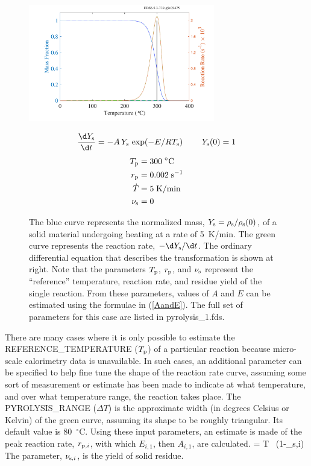 \documentclass[11pt]{book}
\begin{document}
\begin{figure}[ht]
\noindent
\begin{minipage}{0.5\textwidth}
\includegraphics[width=3.2in]{SCRIPT_FIGURES/pyrolysis_1}
\end{minipage}
\hfill
\begin{minipage}{0.5\textwidth}
\begin{equation*}
   \frac{\d Y_{\rm s}}{\d t} = -A \, Y_{\rm s} \, \exp(-E/RT_{\rm s})   \quad \; \quad    Y_{\rm s}(0) =1
\end{equation*}
\begin{align*}
   T_{\rm p} &= 300 \; ^\circ\mathrm{C}  \\
   r_{\rm p} &= 0.002   \; \mathrm{s}^{-1}  \\
   \dot{T} &= 5 \; \mathrm{K/min} \\
   \nu_{\rm s} &= 0 \\
\end{align*}
\end{minipage}
\caption[Simple demonstration of the pyrolysis model]{The blue curve represents the normalized mass, $Y_{\rm s}=\rho_{\rm s}/\rho_{\rm s}(0)$, of a solid material
undergoing heating at a rate of 5~K/min. The green curve represents the reaction rate, $-\d Y_{\rm s}/\d t$. The ordinary differential equation that describes the transformation is shown at right. Note that the parameters $T_{\rm p}$, $r_{\rm p}$, and $\nu_{\rm s}$ represent the ``reference'' temperature,
reaction rate, and residue yield of the single reaction. From these parameters, values of $A$ and $E$ can be estimated using
the formulae in (\ref{AandE}). The full set of parameters for this case are listed in {\ct pyrolysis\_1.fds}.}
\label{pyrolysis}
\end{figure}

There are many cases where it is only possible to estimate the {\ct REFERENCE\_TEMPERATURE} ($T_{\rm p}$) of a particular reaction because micro-scale calorimetry data is unavailable. In such cases, an additional parameter can be specified to help fine tune the shape of the reaction rate curve, assuming some sort of measurement or estimate has been made to indicate at what temperature, and over what temperature range, the reaction takes place. The {\ct PYROLYSIS\_RANGE} ($\Delta T$) is the approximate width (in degrees Celsius or Kelvin) of the green curve, assuming its shape to be roughly triangular. Its default value is 80~$^\circ$C. Using these input parameters, an estimate is made of the peak reaction rate, $r_{{\rm p},i}$, with which $E_{i,1}$, then $A_{i,1}$, are calculated.
\be
    =  {\Delta T} \, (1-\nu_{{\rm s},i}) \label{r_p}
\ee
The parameter, $\nu_{{\rm s},i}$, is the yield of solid residue.
\end{document}
